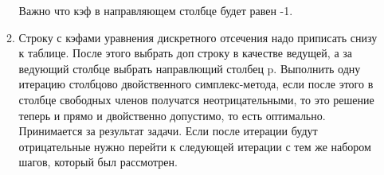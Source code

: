 \begin{enumerate}
\begin{enumerate}
    Важно что кэф в направляющем столбце будет равен -1.
    \item Строку с кэфами уравнения дискретного отсечения надо приписать снизу к таблице. После этого выбрать доп строку в качестве ведущей, а за ведующий столбце выбрать направлющий столбец p.
    Выполнить одну итерацию столбцово двойственного симплекс-метода, если после этого в столбце свободных членов получатся неотрицательными, то это решение теперь и прямо и двойственно допустимо, то есть оптимально.
    Принимается  за результат задачи.
    Если после итерации будут отрицательные нужно перейти к следующей итерации с тем же набором шагов, который был рассмотрен.
  \end{enumerate}
\end{enumerate}




